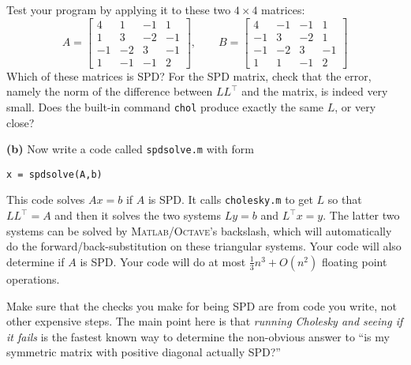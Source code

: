 \documentclass[12pt]{amsart}
\newcommand{\Matlab}{\textsc{Matlab}\xspace}
\newcommand{\Octave}{\textsc{Octave}\xspace}
\newcommand{\prob}[1]{\medskip\noindent\textbf{#1}\quad }
\newcommand{\epart}[1]{\medskip\noindent\textbf{(#1)}\quad }
\begin{document}
Test your program by applying it to these two $4\times 4$ matrices:
   $$A = \begin{bmatrix}
        4 &       1 &      -1 &       1 \\
        1 &       3 &      -2 &      -1 \\
       -1 &      -2 &       3 &      -1 \\
        1 &      -1 &      -1 &       2
    \end{bmatrix}, \qquad
     B = \begin{bmatrix}
        4 &      -1 &      -1 &       1 \\
       -1 &       3 &      -2 &       1 \\
       -1 &      -2 &       3 &      -1 \\
        1 &       1 &      -1 &       2
    \end{bmatrix}$$
Which of these matrices is SPD?  For the SPD matrix, check that the error, namely the norm of the difference between $L L^\top$ and the matrix, is indeed very small.  Does the built-in command \texttt{chol} produce exactly the same $L$, or very close?

\epart{b}  Now write a code called \texttt{spdsolve.m} with form

\centerline{\texttt{x = spdsolve(A,b)}}

\noindent This code solves $A x = b$ if $A$ is SPD.  It calls \texttt{cholesky.m} to get $L$ so that $L L^\top = A$ and then it solves the two systems $L y = b$ and $L^\top x = y$.  The latter two systems can be solved by \Matlab/\Octave's backslash, which will automatically do the forward/back-substitution on these triangular systems.  Your code will also determine if $A$ is SPD.  Your code will do at most $\frac{1}{3} n^3 + O(n^2)$ floating point operations.

Make sure that the checks you make for being SPD are from code you write, not other expensive steps.  The main point here is that \emph{running Cholesky and seeing if it fails} is the fastest known way to determine the non-obvious answer to ``is my symmetric matrix with positive diagonal actually SPD?''

\end{document}
